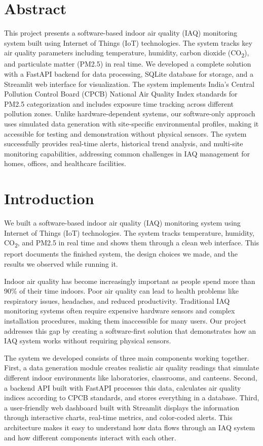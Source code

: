 \documentclass[12pt]{report}
\begin{document}
\section*{Abstract}
This project presents a software-based indoor air quality (IAQ) monitoring system built using Internet of Things (IoT) technologies. The system tracks key air quality parameters including temperature, humidity, carbon dioxide (CO\textsubscript{2}), and particulate matter (PM2.5) in real time. We developed a complete solution with a FastAPI backend for data processing, SQLite database for storage, and a Streamlit web interface for visualization. The system implements India's Central Pollution Control Board (CPCB) National Air Quality Index standards for PM2.5 categorization and includes exposure time tracking across different pollution zones. Unlike hardware-dependent systems, our software-only approach uses simulated data generation with site-specific environmental profiles, making it accessible for testing and demonstration without physical sensors. The system successfully provides real-time alerts, historical trend analysis, and multi-site monitoring capabilities, addressing common challenges in IAQ management for homes, offices, and healthcare facilities.

\section{Introduction}
We built a software-based indoor air quality (IAQ) monitoring system using Internet of Things (IoT) technologies. The system tracks temperature, humidity, CO\textsubscript{2}, and PM2.5 in real time and shows them through a clean web interface. This report documents the finished system, the design choices we made, and the results we observed while running it.

Indoor air quality has become increasingly important as people spend more than 90\% of their time indoors. Poor air quality can lead to health problems like respiratory issues, headaches, and reduced productivity. Traditional IAQ monitoring systems often require expensive hardware sensors and complex installation procedures, making them inaccessible for many users. Our project addresses this gap by creating a software-first solution that demonstrates how an IAQ system works without requiring physical sensors.

The system we developed consists of three main components working together. First, a data generation module creates realistic air quality readings that simulate different indoor environments like laboratories, classrooms, and canteens. Second, a backend API built with FastAPI processes this data, calculates air quality indices according to CPCB standards, and stores everything in a database. Third, a user-friendly web dashboard built with Streamlit displays the information through interactive charts, real-time metrics, and color-coded alerts. This architecture makes it easy to understand how data flows through an IAQ system and how different components interact with each other.
\end{document}
